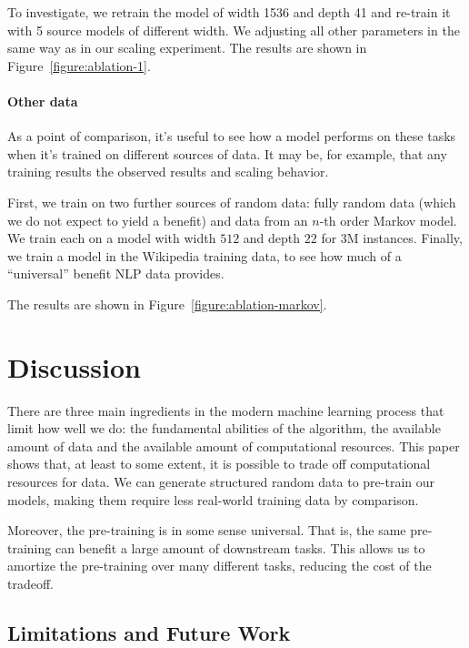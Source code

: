 \documentclass{article} %
\begin{document}
To investigate, we retrain the model of width 1536 and depth 41 and re-train it with 5 source models of different width. We adjusting all other parameters in the same way as in our scaling experiment. The results are shown in Figure~\ref{figure:ablation-1}.

\paragraph{Other data} As a point of comparison, it's useful to see how a model performs on these tasks when it's trained on different sources of data. It may be, for example, that any training results the observed results and scaling behavior.

First, we train on two further sources of random data: fully random data (which we do not expect to yield a benefit) and data from an $n$-th order Markov model. We train each on a model with width $512$ and depth $22$ for 3M instances. Finally, we train a model in the Wikipedia training data, to see how much of a ``universal'' benefit NLP data provides.\footnotemark

The results are shown in Figure~\ref{figure:ablation-markov}.


\section{Discussion}

There are three main ingredients in the modern machine learning process that limit how well we do: the fundamental abilities of the algorithm, the available amount of data and the available amount of computational resources. This paper shows that, at least to some extent, it is possible to trade off computational resources for data. We can generate structured random data to pre-train our models, making them require less real-world training data by comparison.

Moreover, the pre-training is in some sense universal. That is, the same pre-training can benefit a large amount of downstream tasks. This allows us to amortize the pre-training over many different tasks, reducing the cost of the tradeoff. 

\subsection{Limitations and Future Work}
\end{document}
